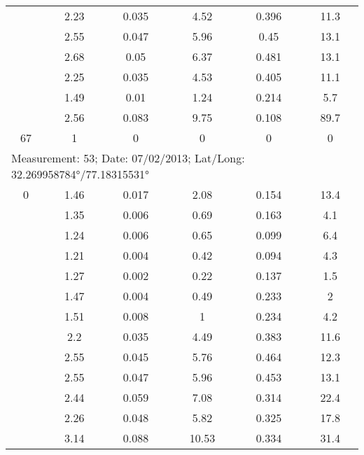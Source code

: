 \begin{longtable}{cccccc}
		& 2.23  & 0.035 & 4.52  & 0.396 & 11.3 \\
		
		& 2.55  & 0.047 & 5.96  & 0.45  & 13.1 \\
		
		& 2.68  & 0.05  & 6.37  & 0.481 & 13.1 \\
		
		& 2.25  & 0.035 & 4.53  & 0.405 & 11.1 \\
		
		& 1.49  & 0.01  & 1.24  & 0.214 & 5.7 \\
		
		& 2.56  & 0.083 & 9.75  & 0.108 & 89.7 \\
		
		67    & 1     & 0     & 0     & 0     & 0 \\
		\midrule
		\multicolumn{6}{l}{Measurement: 53; Date: 07/02/2013;
			Lat/Long: 32.269958784°/77.18315531°} \\		
		\midrule
		0     & 1.46  & 0.017 & 2.08  & 0.154 & 13.4 \\
		
		& 1.35  & 0.006 & 0.69  & 0.163 & 4.1 \\
		
		& 1.24  & 0.006 & 0.65  & 0.099 & 6.4 \\
		
		& 1.21  & 0.004 & 0.42  & 0.094 & 4.3 \\
		
		& 1.27  & 0.002 & 0.22  & 0.137 & 1.5 \\
		
		& 1.47  & 0.004 & 0.49  & 0.233 & 2 \\
		
		& 1.51  & 0.008 & 1     & 0.234 & 4.2 \\
		
		& 2.2   & 0.035 & 4.49  & 0.383 & 11.6 \\
		
		& 2.55  & 0.045 & 5.76  & 0.464 & 12.3 \\
		
		& 2.55  & 0.047 & 5.96  & 0.453 & 13.1 \\
		
		& 2.44  & 0.059 & 7.08  & 0.314 & 22.4 \\
		
		& 2.26  & 0.048 & 5.82  & 0.325 & 17.8 \\
		
		& 3.14  & 0.088 & 10.53 & 0.334 & 31.4 \\
		

\end{longtable}
